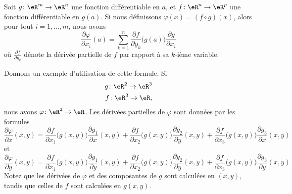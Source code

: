 \begin{theorem}		\label{ThoDerDirFnComp}
    Soit $g\colon \eR^m\to \eR^n$ une fonction différentiable en $a$, et $f\colon \eR^n\to \eR^p$ une fonction différentiable en $g(a)$. Si nous définissons $\varphi(x)=(f\circ g)(x)$, alors pour tout $i=1,\ldots,m$, nous avons
	\begin{equation}
		\frac{ \partial \varphi }{ \partial x_i }(a)=\sum_{k=1}^n\frac{ \partial f }{ \partial y_k }\big( g(a) \big)\frac{ \partial g }{ \partial x_i }
	\end{equation}
	où $\frac{ \partial f }{ \partial y_k }$ dénote la dérivée partielle de $f$ par rapport à sa $k$-ième variable.
\end{theorem}

Donnons un exemple d'utilisation de cette formule. Si
\begin{equation}
	\begin{aligned}[]
		g\colon \eR^2\to \eR^3\\
		f\colon \eR^3\to \eR,
	\end{aligned}
\end{equation}
nous avons $\varphi\colon \eR^2\to \eR$. Les dérivées partielles de $\varphi$ sont données par les formules
\begin{equation}
	\frac{ \partial \varphi }{ \partial x }(x,y)=\frac{ \partial f }{ \partial x_1 }\big( g(x,y) \big)\frac{ \partial g_1 }{ \partial x }(x,y)+\frac{ \partial f }{ \partial x_2 }\big( g(x,y) \big)\frac{ \partial g_2 }{ \partial y }(x,y)+\frac{ \partial f }{ \partial x_3 }\big( g(x,y) \big)\frac{ \partial g_3 }{ \partial x }(x,y)
\end{equation}
et
\begin{equation}
	\frac{ \partial \varphi }{ \partial y }(x,y)=\frac{ \partial f }{ \partial x_1 }\big( g(x,y) \big)\frac{ \partial g_1 }{ \partial y }(x,y)+\frac{ \partial f }{ \partial x_2 }\big( g(x,y) \big)\frac{ \partial g_2 }{ \partial y }(x,y)+\frac{ \partial f }{ \partial x_3 }\big( g(x,y) \big)\frac{ \partial g_3 }{ \partial y }(x,y)
\end{equation}
Notez que les dérivées de $\varphi$ et des composantes de $g$ sont calculées en $(x,y)$, tandis que celles de $f$ sont calculées en $g(x,y)$.
